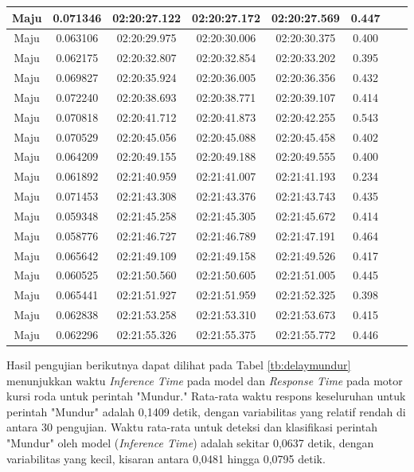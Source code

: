 \begin{longtable}{|c|c|c|c|c|c|c|c|}
      Maju & 0.071346 & 02:20:27.122 & 02:20:27.172 & 02:20:27.569 & 0.447 \\ \hline
      Maju & 0.063106 & 02:20:29.975 & 02:20:30.006 & 02:20:30.375 & 0.400 \\ \hline
      Maju & 0.062175 & 02:20:32.807 & 02:20:32.854 & 02:20:33.202 & 0.395 \\ \hline
      Maju & 0.069827 & 02:20:35.924 & 02:20:36.005 & 02:20:36.356 & 0.432 \\ \hline
      Maju & 0.072240 & 02:20:38.693 & 02:20:38.771 & 02:20:39.107 & 0.414 \\ \hline
      Maju & 0.070818 & 02:20:41.712 & 02:20:41.873 & 02:20:42.255 & 0.543 \\ \hline
      Maju & 0.070529 & 02:20:45.056 & 02:20:45.088 & 02:20:45.458 & 0.402 \\ \hline
      Maju & 0.064209 & 02:20:49.155 & 02:20:49.188 & 02:20:49.555 & 0.400 \\ \hline
      Maju & 0.061892 & 02:21:40.959 & 02:21:41.007 & 02:21:41.193 & 0.234 \\ \hline
      Maju & 0.071453 & 02:21:43.308 & 02:21:43.376  & 02:21:43.743 & 0.435 \\ \hline
      Maju & 0.059348 & 02:21:45.258 & 02:21:45.305 & 02:21:45.672 & 0.414 \\ \hline
      Maju & 0.058776 & 02:21:46.727 & 02:21:46.789  & 02:21:47.191 & 0.464 \\ \hline
      Maju & 0.065642 & 02:21:49.109 & 02:21:49.158 & 02:21:49.526 & 0.417 \\ \hline
      Maju & 0.060525 & 02:21:50.560 & 02:21:50.605 & 02:21:51.005 & 0.445 \\ \hline
      Maju & 0.065441 & 02:21:51.927 & 02:21:51.959  & 02:21:52.325 & 0.398 \\ \hline
      Maju & 0.062838 & 02:21:53.258 & 02:21:53.310 & 02:21:53.673 & 0.415 \\ \hline
      Maju & 0.062296 & 02:21:55.326 & 02:21:55.375 & 02:21:55.772 & 0.446 \\ \hline
\end{longtable}

Hasil pengujian berikutnya dapat dilihat pada Tabel \ref{tb:delaymundur} menunjukkan waktu \emph{Inference Time} pada model dan \emph{Response Time} pada motor kursi roda untuk perintah "Mundur." Rata-rata waktu respons keseluruhan untuk perintah "Mundur" adalah 0,1409 detik, dengan variabilitas yang relatif rendah di antara 30 pengujian. Waktu rata-rata untuk deteksi dan klasifikasi perintah "Mundur" oleh model (\emph{Inference Time}) adalah sekitar 0,0637 detik, dengan variabilitas yang kecil, kisaran antara 0,0481 hingga 0,0795 detik.

